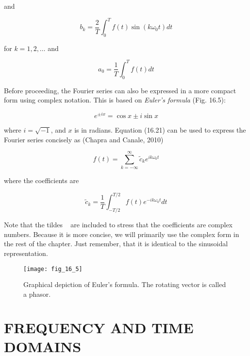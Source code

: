\documentclass[../main.tex]{subfiles}
\begin{document}
\noindent and

\begin{equation}
	\tag{16.19}
	b_k = \frac{2}{T} \int ^ T _ 0 f(t) \sin (k \omega_0 t) dt
\end{equation}

\noindent for $k = 1, 2, \dots$ and

\begin{equation}
	\tag{16.20}
	a_0 = \frac{1}{T} \int ^ T _ 0 f(t)dt
\end{equation}


Before proceeding, the Fourier series can also be expressed in a more compact form
using complex notation. This is based on \textit{Euler's formula} (Fig. 16.5):

\begin{equation}
	\tag{16.21}
	e^{\pm ix} = \cos x \pm  i \sin x
\end{equation}

\noindent where $i = \sqrt{-1}$, and $x$ is in radians. Equation (16.21) can be used to express the Fourier
series concisely as (Chapra and Canale, 2010)

\begin{equation}
	\tag{16.22}
	f(t) = \sum _ {k=-\infty} ^ {\infty} \tilde{c}_k e^{i k \omega_0 t} 
\end{equation}

\noindent where the coefficients are

\begin{equation}
	\tag{16.23}
	\tilde{c}_k = \frac{1}{T} \int ^ {T/2} _ {-T/2} f(t) e ^ {-ik \omega_0 t} dt
\end{equation}

Note that the tildes ~ are included to stress that the coefficients are complex numbers.
Because it is more concise, we will primarily use the complex form in the rest of the
chapter. Just remember, that it is identical to the sinusoidal representation.

\begin{figure}[H] %
	\centering
	\texttt{[image: fig\_16\_5]}
	\caption{\textsf{Graphical depiction of Euler's formula. The rotating vector is called a phasor.}}
	\label{fig:fig_16_5}
\end{figure}

\label{cha:cha_P_16_3} %
\section{FREQUENCY AND TIME DOMAINS}
\end{document}
